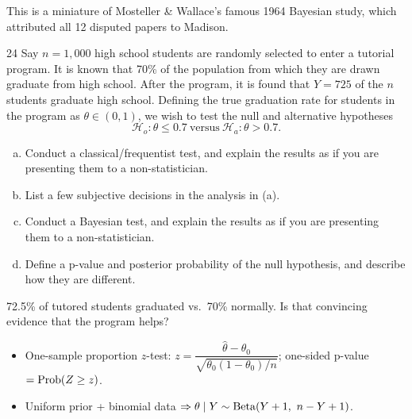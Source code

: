\documentclass[11pt]{article}
\begin{document}
\begin{takeaway}
This is a miniature of Mosteller \& Wallace's famous 1964 Bayesian study, which attributed all 12 disputed papers to Madison.
\end{takeaway}


\begin{problem}{24}
Say $n=1{,}000$ high school students are randomly selected to enter a tutorial program. It is known that 70\% of the population from which they are drawn graduate from high school. After the program, it is found that $Y=725$ of the $n$ students graduate high school. Defining the true graduation rate for students in the program as $\theta\in(0,1)$, we wish to test the null and alternative hypotheses
\[
\mathcal H_o:\theta\le0.7\ \text{versus}\ \mathcal H_a:\theta>0.7.
\]
\begin{enumerate}[(a)]
\item Conduct a classical/frequentist test, and explain the results as if you are presenting them to a non-statistician.
\item List a few subjective decisions in the analysis in (a).
\item Conduct a Bayesian test, and explain the results as if you are presenting them to a non-statistician.
\item Define a p-value and posterior probability of the null hypothesis, and describe how they are different.
\end{enumerate}
\end{problem}

\begin{restate}
72.5\% of tutored students graduated vs.\ 70\% normally. Is that convincing evidence that the program helps?
\end{restate}

\begin{recall}
\begin{itemize}
\item One-sample proportion $z$-test: $z=\dfrac{\hat\theta-\theta_0}{\sqrt{\theta_0(1-\theta_0)/n}}$; one-sided p-value $=\mathrm{Prob}(Z\ge z)$.
\item Uniform prior + binomial data $\Rightarrow\theta\mid Y\sim\dist{Beta}(Y+1,\ n-Y+1)$.
\end{itemize}
\end{recall}
\end{document}

